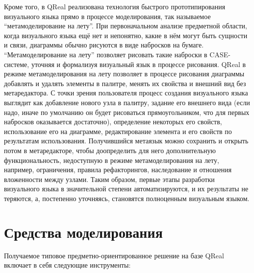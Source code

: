 \documentclass[a4, 12pt]{article}
\begin{document}
Кроме того, в QReal реализована технология быстрого прототипирования визуального языка прямо в процессе моделирования, так называемое ``метамоделирование на лету''. При первоначальном анализе предметной области, когда визуального языка ещё нет и непонятно, какие в нём могут быть сущности и связи, диаграммы обычно рисуются в виде набросков на бумаге. ``Метамоделирование на лету'' позволяет рисовать такие наброски в CASE-системе, уточняя и формализуя визуальный язык в процессе рисования. QReal в режиме метамоделирования на лету позволяет в процессе рисования диаграммы добавлять и удалять элементы в палитре, менять их свойства и внешний вид без метаредактора. С точки зрения пользователя процесс создания визуального языка выглядит как добавление нового узла в палитру, задание его внешнего вида (если надо, иначе по умолчанию он будет рисоваться прямоугольником, что для первых набросков оказывается достаточно), определение некоторых его свойств, использование его на диаграмме, редактирование элемента и его свойств 
по результатам использования. Получившийся метаязык можно сохранить и открыть потом в метаредакторе, чтобы доопределить для него дополнительную функциональность, недоступную в режиме метамоделирования на лету, например, ограничения, правила рефакторингов, наследование и отношения вложенности между узлами. Таким образом, первые этапы разработки визуального языка в значительной степени автоматизируются, и их результаты не теряются, а, постепенно уточняясь, становятся полноценным визуальным языком.

\section{Средства моделирования}

Получаемое типовое предметно-ориентированное решение на базе QReal включает в себя следующие инструменты:
\end{document}
